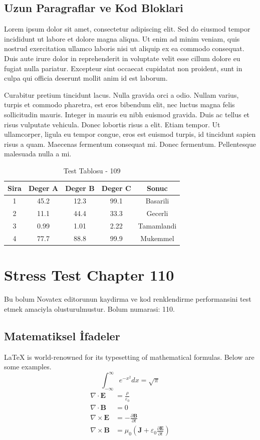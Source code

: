 \documentclass[12pt,a4paper]{article}
\begin{document}
\subsection{Uzun Paragraflar ve Kod Bloklari}
Lorem ipsum dolor sit amet, consectetur adipiscing elit. Sed do eiusmod tempor incididunt ut labore et dolore magna aliqua. Ut enim ad minim veniam, quis nostrud exercitation ullamco laboris nisi ut aliquip ex ea commodo consequat. Duis aute irure dolor in reprehenderit in voluptate velit esse cillum dolore eu fugiat nulla pariatur. Excepteur sint occaecat cupidatat non proident, sunt in culpa qui officia deserunt mollit anim id est laborum.

Curabitur pretium tincidunt lacus. Nulla gravida orci a odio. Nullam varius, turpis et commodo pharetra, est eros bibendum elit, nec luctus magna felis sollicitudin mauris. Integer in mauris eu nibh euismod gravida. Duis ac tellus et risus vulputate vehicula. Donec lobortis risus a elit. Etiam tempor. Ut ullamcorper, ligula eu tempor congue, eros est euismod turpis, id tincidunt sapien risus a quam. Maecenas fermentum consequat mi. Donec fermentum. Pellentesque malesuada nulla a mi.

\begin{table}[h!]
\centering
\begin{tabular}{|c|c|c|c|c|}
\hline
\textbf{Sira} & \textbf{Deger A} & \textbf{Deger B} & \textbf{Deger C} & \textbf{Sonuc} \\
\hline
1 & 45.2 & 12.3 & 99.1 & Basarili \\
2 & 11.1 & 44.4 & 33.3 & Gecerli \\
3 & 0.99 & 1.01 & 2.22 & Tamamlandi \\
4 & 77.7 & 88.8 & 99.9 & Mukemmel \\
\hline
\end{tabular}
\caption{Test Tablosu - 109}
\end{table}

\newpage
\section{Stress Test Chapter 110}
Bu bolum Novatex editorunun kaydirma ve kod renklendirme performansini test etmek amaciyla olusturulmustur. Bolum numarasi: 110.

\subsection{Matematiksel İfadeler}
\LaTeX{} is world-renowned for its typesetting of mathematical formulas. Below are some examples.
\begin{equation}
\int_{-\infty}^{\infty} e^{-x^2} dx = \sqrt{\pi}
\end{equation}
\begin{align}
\nabla \cdot \mathbf{E} &= \frac{\rho}{\varepsilon_0} \\
\nabla \cdot \mathbf{B} &= 0 \\
\nabla \times \mathbf{E} &= -\frac{\partial \mathbf{B}}{\partial t} \\
\nabla \times \mathbf{B} &= \mu_0\left(\mathbf{J} + \varepsilon_0 \frac{\partial \mathbf{E}}{\partial t}\right)
\end{align}
\end{document}

